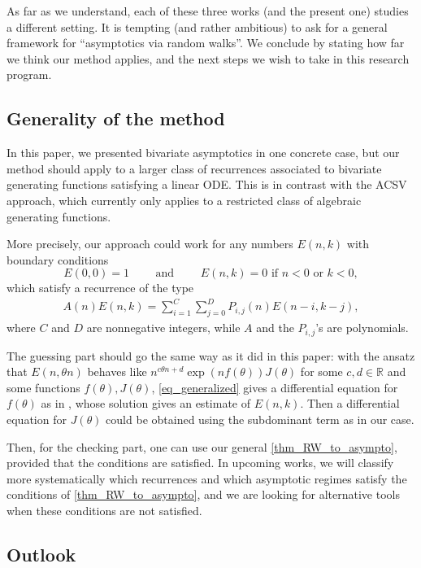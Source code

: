 \documentclass[a4paper,12pt]{article}
\theoremstyle{definition}
\begin{document}
As far as we understand, each of these three works (and the present one) studies a different setting. It is tempting (and rather ambitious) to ask for a general framework for ``asymptotics via random walks''. We conclude by stating how far we think our method applies, and the next steps we wish to take in this research program. 




\subsection{Generality of the method}
In this paper, we presented bivariate asymptotics in one concrete case, but our method should apply to a larger class of recurrences associated to bivariate generating functions satisfying a linear ODE. This is in contrast with the ACSV approach, which currently only applies to a restricted class of algebraic generating functions.

More precisely, our approach could work for any numbers $E(n,k)$
with boundary conditions
\[E(0,0)=1 \qquad \text{ and } \qquad E(n,k)=0\text{ if } n<0 \text{ or }k<0,\]
which satisfy a recurrence of the type
\begin{align}\label{eq_generalized}
    A(n)E(n,k)=\sum_{i=1}^C\sum_{j=0}^D P_{i,j}(n)E(n-i,k-j),
\end{align}
where $C$ and $D$ are nonnegative integers, while $A$ and the $P_{i,j}$'s are polynomials.

The guessing part should go the same way as it did in this paper: 
with the ansatz that  $E(n, \theta n)$ behaves like $n^{c\theta n+d} \exp(n f(\theta))J(\theta)$ for some $c,d\in\mathbb{R}$ and some functions $f(\theta),J(\theta)$, \eqref{eq_generalized} gives a differential equation for $f(\theta)$ as in , whose solution gives an estimate of $E(n, k)$. Then a differential equation for $J(\theta)$ could be obtained using the subdominant term as in our case. 

Then, for the checking part, one can use our general \cref{thm_RW_to_asympto}, provided that the conditions are satisfied. In upcoming works, we will classify more systematically which recurrences and which asymptotic regimes satisfy the conditions of \cref{thm_RW_to_asympto}, and we are looking for alternative tools when these conditions are not satisfied. 





\subsection{Outlook}%
\end{document}

